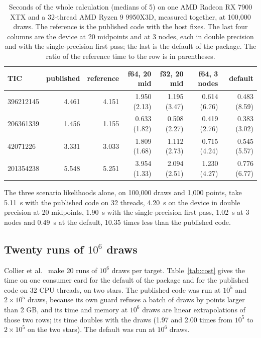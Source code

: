 \documentclass[11pt]{article}
\begin{document}
\begin{table}[ht]
\centering
\caption{Seconds of the whole calculation (medians of 5) on one AMD Radeon RX 7900 XTX and a 32-thread AMD Ryzen 9 9950X3D, measured together, at 100,000 draws. The reference is the published code with the host fixes. The last four columns are the device at 20 midpoints and at 3 nodes, each in double precision and with the single-precision first pass; the last is the default of the package. The ratio of the reference time to the row is in parentheses.}\label{tab:time}
\footnotesize
\begin{tabular}{lrrrrrr}
\toprule
TIC & published & reference & f64, 20 mid & f32, 20 mid & f64, 3 nodes & default \\
\midrule
396212145 & 4.461 & 4.151 & 1.950 (2.13) & 1.195 (3.47) & 0.614 (6.76) & 0.483 (8.59) \\
206361339 & 1.456 & 1.155 & 0.633 (1.82) & 0.508 (2.27) & 0.419 (2.76) & 0.383 (3.02) \\
42071226  & 3.331 & 3.033 & 1.809 (1.68) & 1.112 (2.73) & 0.715 (4.24) & 0.545 (5.57) \\
201354238 & 5.548 & 5.251 & 3.954 (1.33) & 2.094 (2.51) & 1.230 (4.27) & 0.776 (6.77) \\
\bottomrule
\end{tabular}
\end{table}


The three scenario likelihoods alone, on 100,000 draws and 1,000 points, take 5.11~s with the published code on 32 threads, 4.20~s on the device in double precision at 20 midpoints, 1.90~s with the single-precision first pass, 1.02~s at 3 nodes and 0.49~s at the default, 10.35 times less than the published code.


\subsection{Twenty runs of $10^{6}$ draws}

Collier et al.\ \cite{collier2026} make 20 runs of $10^{6}$ draws per target. Table~\ref{tab:cost} gives the time on one consumer card for the default of the package and for the published code on 32 CPU threads, on two stars. The published code was run at $10^{5}$ and $2\times10^{5}$ draws, because its own guard refuses a batch of draws by points larger than 2 GB, and its time and memory at $10^{6}$ draws are linear extrapolations of those two rows; its time doubles with the draws (1.97 and 2.00 times from $10^{5}$ to $2\times10^{5}$ on the two stars). The default was run at $10^{6}$ draws.
\end{document}
